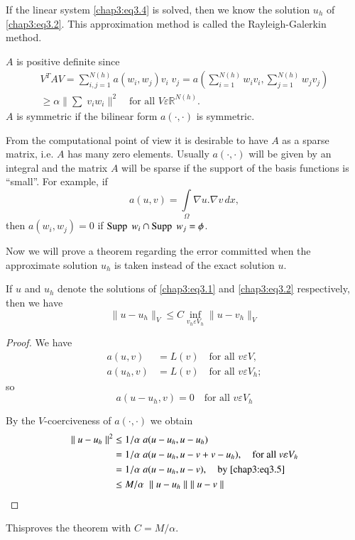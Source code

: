 If the linear system \eqref{chap3:eq3.4} is solved, then we know the
solution $u_h$ of \eqref{chap3:eq3.2}. This approximation method is
called the Rayleigh-Galerkin method. 

$A$ is positive definite since 
\begin{gather*}
V^TAV=\sum\limits_{i,j=1}^{N(h)} a(w_i, w_j)v_i\; v_j= a\left(
\sum\limits_{i=1}^{N(h)}w_iv_i,\sum\limits_{j=1}^{N(h)}w_jv_j\right)\\
\geq\alpha\parallel\sum\; v_iw_i\parallel^2\quad\text{for all } V
\varepsilon\mathbb{R}^{N(h)}.
\end{gather*}
$A$ is symmetric if the bilinear form $a(\cdotp,\cdotp)$ is symmetric.

From the computational point of view it is desirable to have $A$ as a
sparse matrix, i.e. $A$ has many zero elements. Usually\pageoriginale
$a(\cdotp,\cdotp)$ will be given by an integral and the matrix $A$
will be sparse if the support of the basis functions is ``small''. For
example, if
$$
a(u, v)=\int\limits_\Omega\nabla u.\nabla v\, dx,
$$
then $a(w_i, w_j)=0$ if $\operatorname{Supp} \; w_i\cap\operatorname{Supp}\; w_j=\phi$.

Now we will prove a theorem regarding the error committed when the
approximate solution $u_h$ is taken instead of the exact solution $u$.

\setcounter{THM}{0}
\begin{THM}\label{chap3:THM1}
If $u$ and $u_h$ denote the solutions of \eqref{chap3:eq3.1} and
\eqref{chap3:eq3.2} respectively, then we have 
$$
\parallel u-u_h\parallel_V\leq C\inf\limits_{v_h\varepsilon V_h}
\parallel u-v_h\parallel_V
$$
\end{THM}

\begin{proof}
We have 
\begin{align*}
a(u, v) &= L(v)\quad\text{for all } v\varepsilon V,\\
a(u_h, v) &= L(v)\quad\text{for all } v\varepsilon V_h;
\end{align*}
so
\begin{equation}\label{chap3:eq3.5}
a(u-u_h, v)=0\quad\text{for all } v\varepsilon V_h
\end{equation}

By the $V$-coerciveness of $a(\cdotp,\cdotp)$ we obtain
\begin{align*}
\parallel u-u_h\parallel^2 &\leq 1/\alpha \;a(u-u_h, u-u_h)\\
&= 1/\alpha\;a(u-u_h, u-v+v-u_h), \quad\text{for all } v
\varepsilon V_h\\
&= 1/\alpha\;a(u-u_h, u-v), \quad\text{by \eqref{chap3:eq3.5}}\\
&\leq M/\alpha\; \parallel u-u_h\parallel\;\parallel u-v\parallel
\end{align*}
\end{proof}
This\pageoriginale proves the theorem with $C=M/\alpha$. 

